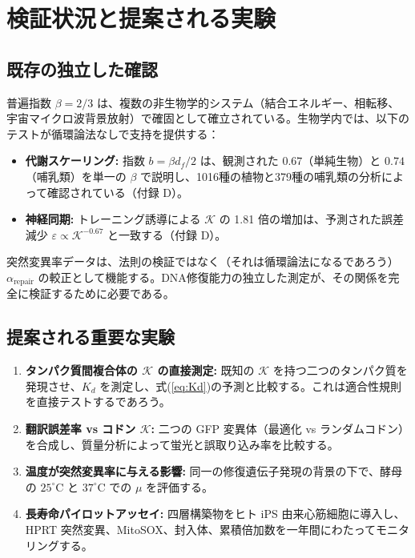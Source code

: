 \documentclass[12pt,a4paper]{ltjsarticle}
\newcommand{\REL}{\mathcal{K}}          %
\begin{document}
	\section{検証状況と提案される実験}
	\label{sec:validation}
	
	\subsection{既存の独立した確認}
	普遍指数 \(\beta = 2/3\) は、複数の非生物学的システム（結合エネルギー、相転移、宇宙マイクロ波背景放射）で確固として確立されている。生物学内では、以下のテストが循環論法なしで支持を提供する：
	\begin{itemize}
		\item \textbf{代謝スケーリング:} 指数 \(b = \beta d_f/2\) は、観測された \(0.67\)（単純生物）と \(0.74\)（哺乳類）を単一の \(\beta\) で説明し、1016種の植物と379種の哺乳類の分析によって確認されている（付録 D）。
		\item \textbf{神経同期:} トレーニング誘導による \(\REL\) の 1.81 倍の増加は、予測された誤差減少 \(\varepsilon \propto \REL^{-0.67}\) と一致する（付録 D）。
	\end{itemize}
	突然変異率データは、法則の検証ではなく（それは循環論法になるであろう）\(\alpha_{\mathrm{repair}}\) の較正として機能する。DNA修復能力の独立した測定が、その関係を完全に検証するために必要である。
	
	\subsection{提案される重要な実験}
	\begin{enumerate}
		\item \textbf{タンパク質間複合体の \(\REL\) の直接測定:} 既知の \(\REL\) を持つ二つのタンパク質を発現させ、\(K_d\) を測定し、式(\ref{eq:Kd})の予測と比較する。これは適合性規則を直接テストするであろう。
		\item \textbf{翻訳誤差率 vs コドン \(\REL\):} 二つの GFP 変異体（最適化 vs ランダムコドン）を合成し、質量分析によって蛍光と誤取り込み率を比較する。
		\item \textbf{温度が突然変異率に与える影響:} 同一の修復遺伝子発現の背景の下で、酵母の \(25^\circ\text{C}\) と \(37^\circ\text{C}\) での \(\mu\) を評価する。
		\item \textbf{長寿命パイロットアッセイ:} 四層構築物をヒト iPS 由来心筋細胞に導入し、HPRT 突然変異、MitoSOX、封入体、累積倍加数を一年間にわたってモニタリングする。
	\end{enumerate}
	
\end{document}
